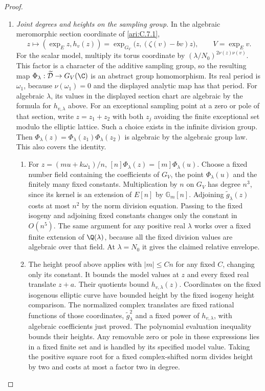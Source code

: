 \begin{proof}
\begin{enumerate}[label=\arabic*.,leftmargin=0pt,labelsep=.5em]
\item \emph{Joint degrees and heights on the sampling group.}
In the algebraic meromorphic section coordinate of
\ref{ari:C.7.1},
\[
 z\longmapsto(\exp_Ez,h_v(z))
   =\exp_{G_V}\bigl(z,(\zeta(v)-bv)z\bigr),\qquad
 V=\exp_Ev.
\]
For the scalar model, multiply its torus coordinate by
$(\lambda/N_0)^{2\nu(z)\nu(v)}$. This factor is a character
of the additive sampling group, so the resulting map
$\Phi_\lambda:\widetilde{\mathcal D}\to G_V(\C)$ is an
abstract group homomorphism. Its real period is $\omega_1$,
because $\nu(\omega_1)=0$ and the displayed analytic map
has that period. For algebraic $\lambda$, its values in the displayed section
chart are algebraic by the formula for $h_{v,\lambda}$ above.
For an exceptional sampling point at a zero or pole of that
section, write $z=z_1+z_2$ with both $z_j$ avoiding the finite
exceptional set modulo the elliptic lattice. Such a choice exists
in the infinite division group. Then
$\Phi_\lambda(z)=\Phi_\lambda(z_1)\Phi_\lambda(z_2)$ is
algebraic by the algebraic group law. This also covers the identity.


\begin{enumerate}[label=(\alph*),leftmargin=1.3em,labelsep=.5em]
\item  For $z=(mu+k\omega_1)/n$,
$[n]\Phi_\lambda(z)=[m]\Phi_\lambda(u)$.
Choose a fixed number field containing the coefficients of
$G_V$, the point $\Phi_\lambda(u)$ and the finitely many
fixed constants. Multiplication by $n$ on $G_V$ has degree
$n^3$, since its kernel is an extension of $E[n]$ by
$\mathbb G_m[n]$. Adjoining $\widetilde g_\lambda(z)$ costs
at most $n^2$ by the norm division equation. Passing to the
fixed isogeny and adjoining fixed constants changes only the
constant in $O(n^5)$. The same argument for any positive real
$\lambda$ works over a fixed finite extension of $\Q(\lambda)$,
because all the fixed division values are algebraic over that
field. At $\lambda=N_0$ it gives the claimed relative envelope.


\item  The height proof above applies with $|m|\le Cn$ for any fixed
$C$, changing only its constant. It bounds the model values at
$z$ and every fixed real translate $z+a$. Their quotients bound
$h_{v,\lambda}(z)$. Coordinates on the fixed isogenous elliptic
curve have bounded height by the fixed isogeny height comparison.
The normalized complex translates are fixed rational functions
of those coordinates, $\widetilde g_\lambda^2$ and a fixed power
of $h_{v,\lambda}$, with algebraic coefficients just proved.
The polynomial evaluation inequality bounds their heights.
Any removable zero or pole in these expressions lies in a fixed
finite set and is handled by its specified model value. Taking the
positive square root for a fixed complex-shifted norm divides
height by two and costs at most a factor two in degree.


\end{enumerate}
\end{enumerate}
\end{proof}
